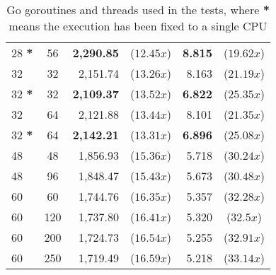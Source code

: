 \begin{table}
\begin{tabular}{lcrcrc}
    28 \textbf{*} & 56         &  \textbf{2,290.85} & (\textbf{$12.45x$}) &    \textbf{8.815} &  (\textbf{$19.62x$})  \\
    32            & 32         &  2,151.74          & ($13.26x$)          &    8.163          &  ($21.19x$)           \\
    32 \textbf{*} & 32         &  \textbf{2,109.37} & (\textbf{$13.52x$}) &    \textbf{6.822} &  (\textbf{$25.35x$})  \\
    32            & 64         &  2,121.88          & ($13.44x$)          &    8.101          &  ($21.35x$)           \\
    32 \textbf{*} & 64         &  \textbf{2,142.21} & (\textbf{$13.31x$}) &    \textbf{6.896} &  (\textbf{$25.08x$})  \\
    48            & 48         &  1,856.93          & ($15.36x$)          &    5.718          &  ($30.24x$)           \\
    48            & 96         &  1,848.47          & ($15.43x$)          &    5.673          &  ($30.48x$)           \\
    60            & 60         &  1,744.76          & ($16.35x$)          &    5.357          &  ($32.28x$)           \\
    60            & 120        &  1,737.80          & ($16.41x$)          &    5.320          &  ($32.5x$)            \\
    60            & 200        &  1,724.73          & ($16.54x$)          &    5.255          &  ($32.91x$)           \\
    60            & 250        &  1,719.49          & ($16.59x$)          &    5.218          &  ($33.14x$)           \\
    \bottomrule
  \end{tabular}
  \caption[Go goroutines and threads]{Go goroutines and threads used in the tests, where \textbf{*} means the execution has been fixed to a single CPU}
  \label{tab:go-routines-cores}
\end{table}
